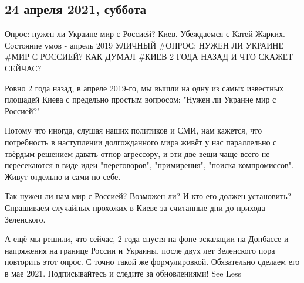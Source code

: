  
 
 
 
 
\subsection{24 апреля 2021, суббота}
\label{sec:24_04_2021}

Опрос: нужен ли Украине мир с Россией? Киев. Убеждаемся с Катей Жарких. Состояние умов - апрель 2019
УЛИЧНЫЙ #ОПРОС: НУЖЕН ЛИ УКРАИНЕ #МИР С РОССИЕЙ?
КАК ДУМАЛ #КИЕВ 2 ГОДА НАЗАД И ЧТО СКАЖЕТ СЕЙЧАС?

Ровно 2 года назад, в апреле 2019-го, мы вышли на одну из самых известных площадей Киева с предельно простым вопросом: "Нужен ли Украине мир с Россией?"

Потому что иногда, слушая наших политиков и СМИ, нам кажется, что потребность в наступлении долгожданного мира живёт у нас параллельно с твёрдым решением давать отпор агрессору, и эти две вещи чаще всего не пересекаются в виде идеи "переговоров", "примирения", "поиска компромиссов". Живут отдельно и сами по себе.

Так нужен ли нам мир с Россией? Возможен ли? И кто его должен установить? Спрашиваем случайных прохожих в Киеве за считанные дни до прихода Зеленского.

А ещё мы решили, что сейчас, 2 года спустя на фоне эскалации на Донбассе и напряжения на границе России и Украины, после двух лет Зеленского пора повторить этот опрос. С точно такой же формулировкой.
Обязательно сделаем его в мае 2021. Подписывайтесь и следите за обновлениями! See Less
